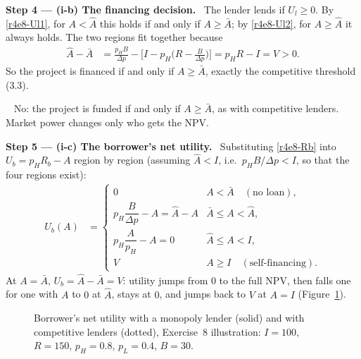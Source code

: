 \documentclass[11pt,a4paper]{article}
\newcommand{\step}[2]{\par\medskip\noindent\textbf{Step #1 --- #2.}~}
\newcommand{\answer}[1]{\par\smallskip\noindent\fbox{\textbf{Answer #1.}}~}
\begin{document}
\step{4}{(i-b) The financing decision} The lender lends if $U_l\ge 0$. By \eqref{r4e8-Ul1}, for
$A<\hat A$ this holds if and only if $A\ge\bar A$; by \eqref{r4e8-Ul2}, for $A\ge\hat A$ it
always holds. The two regions fit together because
\begin{align}
  \hat A-\bar A &= \frac{p_HB}{\Delta p}-\Big[I-p_H\Big(R-\frac{B}{\Delta p}\Big)\Big]
                 = p_HR-I = V > 0. \nonumber
\end{align}
So the project is financed if and only if $A\ge\bar A$, exactly the competitive threshold (3.3).

\answer{(i-b)} No: the project is funded if and only if $A\ge\bar A$, as with competitive
lenders. Market power changes only who gets the NPV.

\step{5}{(i-c) The borrower's net utility} Substituting \eqref{r4e8-Rb} into $U_b=p_HR_b-A$
region by region (assuming $\hat A<I$, i.e.\ $p_HB/\Delta p<I$, so that the four regions exist):
\begin{align}
  U_b(A) &= \begin{cases}
     0 & A<\bar A \quad(\text{no loan}),\\[2pt]
     p_H\dfrac{B}{\Delta p}-A=\hat A-A & \bar A\le A<\hat A,\\[6pt]
     p_H\dfrac{A}{p_H}-A=0 & \hat A\le A<I,\\[2pt]
     V & A\ge I \quad(\text{self-financing}).
  \end{cases} \label{r4e8-Ub}
\end{align}
At $A=\bar A$, $U_b=\hat A-\bar A=V$: utility jumps from $0$ to the full NPV, then falls one for
one with $A$ to $0$ at $\hat A$, stays at $0$, and jumps back to $V$ at $A=I$
(Figure~\ref{r4e8-fig}).

\begin{figure}[ht]
\centering
{}
\caption{Borrower's net utility with a monopoly lender (solid) and with competitive lenders
(dotted), Exercise~8 illustration: $I=100$, $R=150$, $p_H=0.8$, $p_L=0.4$, $B=30$.}
\label{r4e8-fig}
\end{figure}
\end{document}
